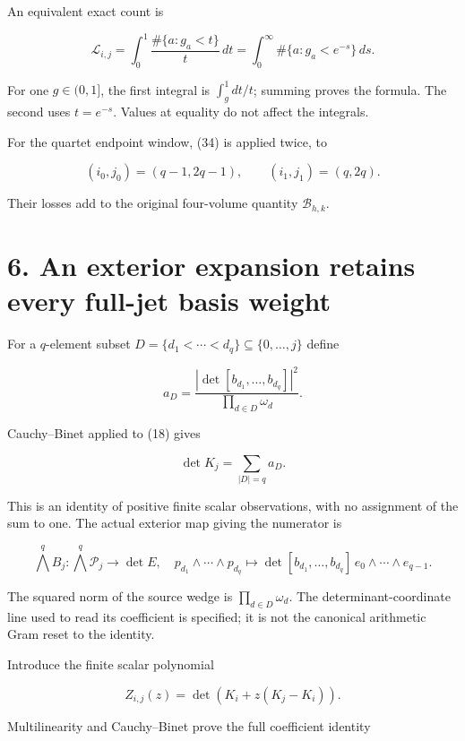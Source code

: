 \documentclass[
  11pt,
]{article}
\begin{document}
An equivalent exact count is

\[
 \boxed{\mathcal L_{i,j}
 =\int_0^1\frac{\#\{a:g_a<t\}}{t}\,dt
 =\int_0^\infty\#\{a:g_a<e^{-s}\}\,ds.}                         \tag{35}
\]

For one \(g\in(0,1]\), the first integral is \(\int_g^1dt/t\); summing
proves the formula. The second uses \(t=e^{-s}\). Values at equality do
not affect the integrals.

For the quartet endpoint window, (34) is applied twice, to

\[
 (i_0,j_0)=(q-1,2q-1),\qquad(i_1,j_1)=(q,2q).                   \tag{36}
\]

Their losses add to the original four-volume quantity
\(\mathcal B_{h,k}\).

\section{6. An exterior expansion retains every full-jet basis
weight}\label{an-exterior-expansion-retains-every-full-jet-basis-weight}

For a \(q\)-element subset
\(D=\{d_1<\cdots<d_q\}\subseteq\{0,\ldots,j\}\) define

\[
 a_D=\frac{|\det[b_{d_1},\ldots,b_{d_q}]|^2}
                 {\prod_{d\in D}\omega_d}.                     \tag{37}
\]

Cauchy--Binet applied to (18) gives

\[
 \boxed{\det K_j=\sum_{|D|=q}a_D.}                              \tag{38}
\]

This is an identity of positive finite scalar observations, with no
assignment of the sum to one. The actual exterior map giving the
numerator is

\[
 \bigwedge^q B_j:\bigwedge^q\mathcal P_j\to\det E,
 \quad p_{d_1}\wedge\cdots\wedge p_{d_q}
       \mapsto\det[b_{d_1},\ldots,b_{d_q}]\,e_0\wedge\cdots\wedge e_{q-1}.
                                                                    \tag{39}
\]

The squared norm of the source wedge is \(\prod_{d\in D}\omega_d\). The
determinant-coordinate line used to read its coefficient is specified;
it is not the canonical arithmetic Gram reset to the identity.

Introduce the finite scalar polynomial

\[
 Z_{i,j}(z)=\det(K_i+z(K_j-K_i)).                                 \tag{40}
\]

Multilinearity and Cauchy--Binet prove the full coefficient identity
\end{document}

